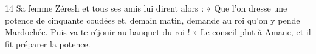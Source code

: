 
14 Sa femme Zéresh et tous ses amis lui dirent alors : « Que l’on dresse une potence de cinquante coudées et, demain matin, demande au roi qu’on y pende Mardochée. Puis va te réjouir au banquet du roi ! » Le conseil plut à Amane, et il fit préparer la potence.